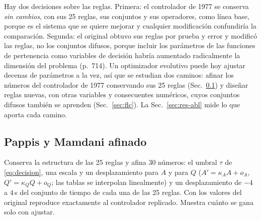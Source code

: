 \documentclass[journal]{IEEEtran}
\begin{document}
Hay dos decisiones sobre las reglas. Primera: el controlador de 1977 se conserva \emph{sin cambios}, con sus 25 reglas, sus conjuntos y sus operadores, como línea base, porque es el sistema que se quiere mejorar y cualquier modificación confundiría la comparación. Segunda: el original obtuvo sus reglas por prueba y error y modificó las reglas, no los conjuntos difusos, porque incluir los parámetros de las funciones de pertenencia como variables de decisión habría aumentado radicalmente la dimensión del problema (p.~714). Un optimizador evolutivo puede hoy ajustar decenas de parámetros a la vez, así que se estudian dos caminos: afinar los números del controlador de 1977 conservando sus 25 reglas (Sec.~\ref{sec:afinado}) y diseñar reglas nuevas, con otras variables y consecuentes numéricos, cuyos conjuntos difusos también se aprenden (Sec.~\ref{sec:flc}). La Sec.~\ref{sec:res-abl} mide lo que aporta cada camino.

\subsection{Pappis y Mamdani afinado}
\label{sec:afinado}
Conserva la estructura de las 25 reglas y afina 30 números: el umbral $\tau$ de \eqref{eq:decision}, una escala y un desplazamiento para $A$ y para $Q$ ($A'=\kappa_AA+o_A$, $Q'=\kappa_QQ+o_Q$; las tablas se interpolan linealmente) y un desplazamiento de $-4$ a $4$\,s del conjunto de tiempo de cada una de las 25 reglas. Con los valores del original reproduce exactamente al controlador replicado. Muestra cuánto se gana solo con ajustar.
\end{document}
